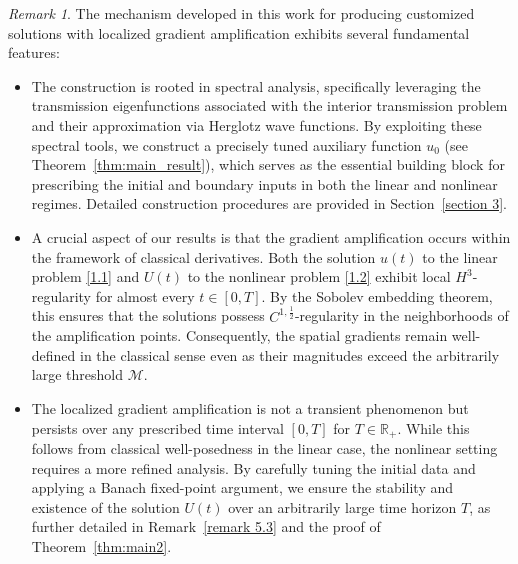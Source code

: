 \documentclass[11pt,reqno,oneside]{amsart}
\numberwithin{equation}{section}
\theoremstyle{definition}
\theoremstyle{remark}
\newtheorem{remark}[theorem]{Remark}
\numberwithin{equation}{section}
\begin{document}
	  



   \begin{remark}
    The mechanism developed in this work for producing customized solutions with localized gradient amplification exhibits several fundamental features:
    \begin{itemize}
        \item[(i)]  The construction is rooted in spectral analysis, specifically leveraging the transmission eigenfunctions associated with the interior transmission problem \cite{ColtonKress} and their approximation via Herglotz wave functions. By exploiting these spectral tools, we construct a precisely tuned auxiliary function $u_0$ (see Theorem~\ref{thm:main_result}), which serves as the essential building block for prescribing the initial and boundary inputs in both the linear and nonlinear regimes. Detailed construction procedures are provided in Section~\ref{section 3}.

        \item[(ii)]  A crucial aspect of our results is that the gradient amplification occurs within the framework of classical derivatives. Both the solution $u(t)$ to the linear problem \eqref{1.1} and $U(t)$ to the nonlinear problem \eqref{1.2} exhibit local $H^3$-regularity for almost every $t \in [0,T]$. By the Sobolev embedding theorem, this ensures that the solutions possess $C^{1,\frac{1}{2}}$-regularity in the neighborhoods of the amplification points. Consequently, the spatial gradients remain well-defined in the classical sense even as their magnitudes exceed the arbitrarily large threshold $\mathcal{M}$.

        \item[(iii)]  The localized gradient amplification is not a transient phenomenon but persists over any prescribed time interval $[0, T]$ for $T \in \mathbb{R}_+$. While this follows from classical well-posedness in the linear case, the nonlinear setting requires a more refined analysis. By carefully tuning the initial data and applying a Banach fixed-point argument, we ensure the stability and existence of the solution $U(t)$ over an arbitrarily large time horizon $T$, as further detailed in Remark~\ref{remark 5.3} and the proof of Theorem~\ref{thm:main2}.
    \end{itemize}
\end{remark}
\end{document}
